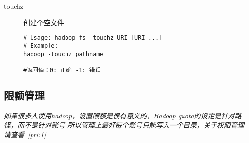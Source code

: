 \documentclass{article}
\begin{document}
\begin{description}
\begin{verbatim}
\end{verbatim}

\item[touchz] 创建个空文件

\begin{verbatim}
# Usage: hadoop fs -touchz URI [URI ...]
# Example:
hadoop -touchz pathname

#返回值：0: 正确 -1: 错误
\end{verbatim}
\end{description}

\subsection{限额管理}
\textit{
如果很多人使用hadoop，设置限额是很有意义的，Hadoop quota的设定是针对路径，而不是针对账号
所以管理上最好每个账号只能写入一个目录，关于权限管理请查看~\ref{pri:1}
}
\end{document}
